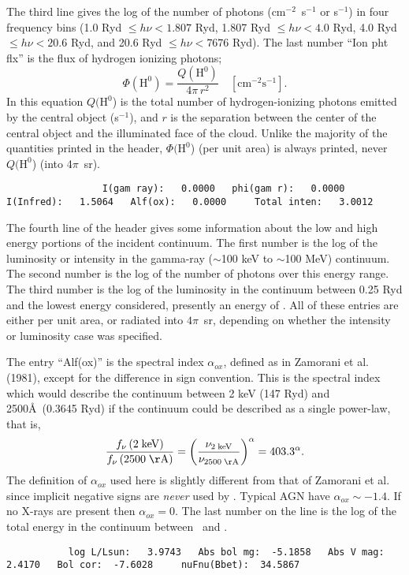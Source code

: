 The third line gives the log of the number of photons
(cm$^{-2}$~s$^{-1}$ or s$^{-1}$)
in four frequency bins (1.0 Ryd $\le h\nu < 1.807$ Ryd, 1.807 Ryd
$\le h\nu < 4.0$ Ryd, 4.0 Ryd $\le h\nu < 20.6$ Ryd,
and 20.6 Ryd $\le h\nu < 7676$ Ryd).
The last number ``Ion pht flx'' is the flux of hydrogen ionizing photons;
\begin{equation}
\Phi \left( {{{\mathrm{H}}^{\mathrm{0}}}} \right) = \frac{{Q\left(
{{{\mathrm{H}}^{\mathrm{0}}}} \right)}}{{4\pi \,{r^2}}}\quad
  [\mathrm{cm}^{-2} \mathrm{s}^{-1}].%
\end{equation}
In this equation $Q(\mathrm{H}^0$) is the total number of
hydrogen-ionizing photons
emitted by the central object (s$^{-1}$), and $r$ is the
separation between the
center of the central object and the illuminated face of the cloud.  Unlike
the majority of the quantities printed in the header,
$\Phi(\mathrm{H}^0$) (per unit area)
is always printed, never $Q(\mathrm{H}^0$) (into 4$\pi$~sr).
{\setverbatimfontsize{\tiny}
\begin{verbatim}
                 I(gam ray):   0.0000   phi(gam r):   0.0000   I(Infred):   1.5064   Alf(ox):   0.0000     Total inten:   3.0012
\end{verbatim}
}

The fourth line of the header gives some information about the low and
high energy portions of the incident continuum.
The first number is the
log of the luminosity or intensity in the gamma-ray ($\sim $100 keV  to
$\sim$100 MeV)
continuum.
The second number is the log of the number of photons over this
energy range.
The third number is the log of the luminosity in the continuum
between 0.25 Ryd and the lowest energy considered,
presently an energy of \emm .
All of these entries are either per unit area, or radiated
into $4\pi$~sr, depending on whether the intensity or luminosity case was
specified.

The entry ``Alf(ox)'' is the spectral index $\alpha_{ox}$,
defined as in Zamorani
et al. (1981), except for the difference in sign convention.
This is the
spectral index which would describe the continuum between 2 keV (147 Ryd)
and 2500\AA\ (0.3645 Ryd) if the continuum could be described
as a single power-law, that is,
\begin{equation}
\frac{{{f_\nu }\left( {2\;{\mathrm{keV}}} \right)}}{{{f_\nu }\left(
{2500\;{\mathrm{{\AA}}}} \right)}} = {\left( {\frac{{{\nu
_{2\;{\mathrm{keV}}}}}}{{{\nu _{2500\;{\mathrm{{\AA}}}}}}}} \right)^\alpha } =
{403.3^\alpha }.%
\end{equation}
The definition of $\alpha_{ox}$ used here is slightly different from that of Zamorani
et al. since implicit negative signs are \emph{never} used by \Cloudy.  Typical
AGN have $\alpha_{ox} \sim  -1.4$.
If no X-rays are present then
$\alpha_{ox} = 0$.
The last number
on the line is the log of the total energy in the continuum between
\emm\ and \egamrymev .
{\setverbatimfontsize{\tiny}
\begin{verbatim}
           log L/Lsun:   3.9743   Abs bol mg:  -5.1858   Abs V mag:   2.4170   Bol cor:  -7.6028     nuFnu(Bbet):  34.5867
\end{verbatim}
}

